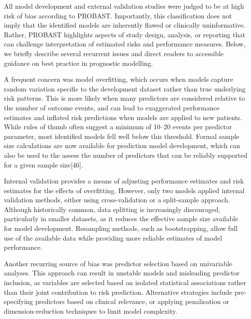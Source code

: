 All model development and external validation studies were judged to be at high risk of bias according to PROBAST. Importantly, this classification does not imply that the identified models are inherently flawed or clinically uninformative. Rather, PROBAST highlights aspects of study design, analysis, or reporting that can challenge interpretation of estimated risks and performance measures\cite{moons2019}. Below, we briefly describe several recurrent issues and direct readers to accessible guidance on best practice in prognostic modelling.

A frequent concern was model overfitting, which occurs when models capture random variation specific to the development dataset rather than true underlying risk patterns. This is more likely when many predictors are considered relative to the number of outcome events, and can lead to exaggerated performance estimates and inflated risk predictions when models are applied to new patients\cite{dhimanSampleSizeRequirements2023,steyerberg2019book}. While rules of thumb often suggest a minimum of 10--20 events per predictor parameter, most identified models fell well below this threshold. Formal sample size calculations are now available for prediction model development, which can also be used to the assess the number of predictors that can be reliably supported for a given sample size[46].

Internal validation provides a means of adjusting performance estimates and risk estimates for the effects of overfitting. However, only two models applied internal validation methods, either using cross-validation\cite{abongomeraDevelopmentExternalValidation2017} or a split-sample approach\cite{coura-vitalPrognosticFactorsScoring2014}. Although historically common, data splitting is increasingly discouraged, particularly in smaller datasets, as it reduces the effective sample size available for model development. Resampling methods, such as bootstrapping, allow full use of the available data while providing more reliable estimates of model performance\cite{moons2015}.

Another recurring source of bias was predictor selection based on univariable analyses. This approach can result in unstable models and misleading predictor inclusion, as variables are selected based on isolated statistical associations rather than their joint contribution to risk prediction. Alternative strategies include pre-specifying predictors based on clinical relevance, or applying penalisation or dimension-reduction techniques to limit model complexity\cite{moons2019,efthimiou2024}.

